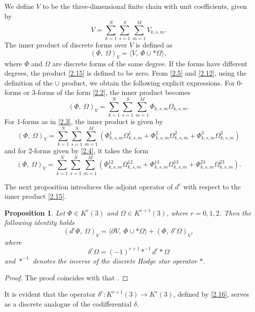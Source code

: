 \documentclass[english]{article}
\theoremstyle{plain}
\newtheorem{prop}[thm]{Proposition}
\theoremstyle{definition}
\theoremstyle{remark}
\numberwithin{equation}{section}
\begin{document}
  We define $V$  to be the three-dimensional finite chain with unit coefficients, given by
\begin{equation}\label{2.14}
  V=\sum_{k=1}^N\sum_{s=1}^S\sum_{m=1}^MV_{k,s,m}.
\end{equation}
The inner product of discrete forms over $V$  is defined as
 \begin{equation}\label{2.15}
 (\Phi, \ \Omega)_V=\langle V, \ \Phi\cup\ast\Omega\rangle,
 \end{equation}
 where  $\Phi$ and $\Omega$ are discrete forms of the same degree.
   If the forms have different degrees, the product \eqref{2.15} is defined to be zero.
  From \eqref{2.5} and \eqref{2.12}, using the definition of the $\cup$ product, we obtain the following explicit expressions.
For 0-forms or 3-forms  of the form \eqref{2.2}, the inner product becomes
   \begin{equation*}\label{}
 (\Phi, \ \Omega)_V=\sum_{k=1}^N\sum_{s=1}^S\sum_{m=1}^M\Phi_{k,s,m}\Omega_{k,s,m}.
 \end{equation*}
 For 1-forms as in \eqref{2.3}, the inner product is given by
\begin{equation*}\label{}
 (\Phi, \ \Omega)_V=\sum_{k=1}^N\sum_{s=1}^S\sum_{m=1}^M(\Phi_{k,s,m}^1\Omega_{k,s,m}^1+\Phi_{k,s,m}^2\Omega_{k,s,m}^2+\Phi_{k,s,m}^3\Omega_{k,s,m}^3)
 \end{equation*}
 and for 2-forms given by  \eqref{2.4}, it takes the form
 \begin{equation*}\label{}
 (\Phi, \ \Omega)_V=\sum_{k=1}^N\sum_{s=1}^S\sum_{m=1}^M(\Phi_{k,s,m}^{12}\Omega_{k,s,m}^{12}+\Phi_{k,s,m}^{13}\Omega_{k,s,m}^{13}+\Phi_{k,s,m}^{23}\Omega_{k,s,m}^{23}).
 \end{equation*}

The next proposition introduces the adjoint operator of $d^c$ with respect to the inner product \eqref{2.15}.
\begin{prop}
 Let $\Phi\in K^r(3)$  and $\Omega\in K^{r+1}(3)$, where $r=0,1,2$. Then the following identity holds
\begin{equation}\label{2.16}
 (d^c\Phi, \ \Omega)_V=\langle \partial V, \ \Phi\cup\ast\Omega\rangle+(\Phi, \ \delta^c\Omega)_V,
\end{equation}
 where
 \begin{equation}\label{2.17}
 \delta^c\Omega=(-1)^{r+1}\ast^{-1}d^c\ast\Omega
 \end{equation}
  and $\ast^{-1}$ denotes the inverse of the discrete Hodge star operator  $\ast$.
\end{prop}
\begin{proof}
 The proof coincides with that \cite[Proposition 2]{S5}.
\end{proof}
It is evident that the operator  $\delta^c: K^{r+1}(3) \rightarrow K^r(3)$, defined by \eqref{2.16}, serves as a discrete analogue of the codifferential $\delta$.
\end{document}
